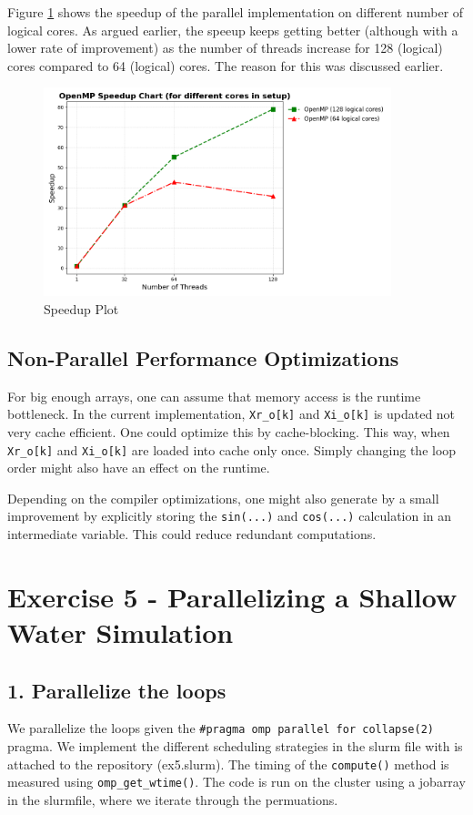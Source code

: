 \documentclass[a4paper,10pt]{article}
\begin{document}
Figure \ref{fig:ex4_speedup} shows the speedup of the parallel implementation on different number of logical cores. As argued earlier, the speeup keeps getting better (although with a lower rate of improvement) as the number of threads increase for 128 (logical) cores compared to 64 (logical) cores. The reason for this was discussed earlier.
\begin{figure}[H]
  \centering
  \includegraphics[width=0.9\textwidth]{img/ex4/speedup_plot.png}
  \caption{Speedup Plot}
  \label{fig:ex4_speedup}
\end{figure}

\subsection{Non-Parallel Performance Optimizations}
For big enough arrays, one can assume that memory access is the runtime bottleneck.
In the current implementation, \verb|Xr_o[k]| and \verb|Xi_o[k]| is updated not very cache efficient.
One could optimize this by cache-blocking.
This way, when \verb|Xr_o[k]| and \verb|Xi_o[k]| are loaded into cache only once.
Simply changing the loop order might also have an effect on the runtime.

Depending on the compiler optimizations, one might also generate by a small improvement by explicitly storing the \verb|sin(...)| and \verb|cos(...)| calculation in an intermediate variable.
This could reduce redundant computations.

\section{Exercise 5 - Parallelizing a Shallow Water Simulation}
\subsection{1. Parallelize the loops}
We parallelize the loops given the \verb|#pragma omp parallel for collapse(2)| pragma. 
We implement the different scheduling strategies in the slurm file with is attached to the repository (ex5.slurm).
The timing of the \verb|compute()| method is measured using \verb|omp_get_wtime()|.
The code is run on the cluster using a jobarray in the slurmfile, where we iterate through the permuations.
\end{document}
